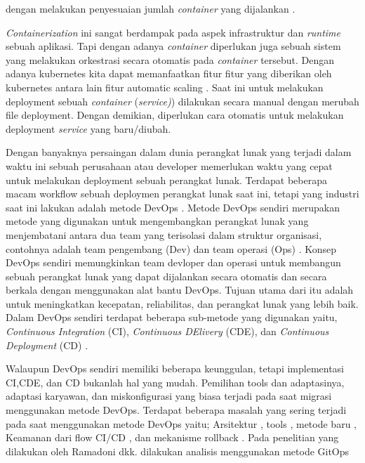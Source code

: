 dengan melakukan penyesuaian jumlah \textit{container} yang  dijalankan \cite{Singh2017}.
\par
\textit{Containerization} \cite{davidbritch} ini sangat berdampak pada aspek infrastruktur dan \textit{runtime} sebuah aplikasi.
Tapi dengan adanya \textit{container} diperlukan juga sebuah  sistem yang melakukan orkestrasi secara otomatis pada \textit{container} tersebut.
Dengan  adanya kubernetes kita dapat memanfaatkan fitur fitur yang diberikan oleh kubernetes antara lain fitur automatic scaling \cite{Leila2018,kubernetes2021What}.
Saat ini untuk melakukan  deployment sebuah \textit{container} (\textit{service)}) dilakukan secara manual dengan merubah file deployment.
Dengan demikian, diperlukan cara otomatis untuk melakukan deployment \textit{service} yang baru/diubah.
\par
Dengan banyaknya persaingan dalam dunia perangkat lunak yang terjadi dalam waktu ini sebuah perusahaan
atau developer memerlukan waktu yang cepat untuk melakukan deployment sebuah perangkat lunak. Terdapat beberapa macam
workflow sebuah deploymen perangkat lunak saat ini, tetapi yang industri saat ini lakukan adalah metode DevOps \cite{Bass2018}.
Metode DevOps sendiri merupakan metode yang digunakan untuk mengembangkan perangkat lunak yang
menjembatani antara dua team yang terisolasi dalam struktur organisasi, contohnya adalah team pengembang (Dev)
dan team operasi (Ops) \cite{Bolscher2019}. Konsep DevOps \cite{Bass2018} sendiri memungkinkan team devloper dan operasi
untuk membangun sebuah perangkat lunak yang dapat dijalankan secara otomatis dan secara berkala dengan menggunakan alat bantu DevOps.
Tujuan utama dari itu adalah untuk meningkatkan kecepatan, reliabilitas, dan perangkat lunak yang lebih baik.
Dalam DevOps sendiri terdapat beberapa sub-metode yang digunakan yaitu, \textit{Continuous Integration} (CI), \textit{Continuous DElivery} (CDE),
dan \textit{Continuous Deployment} (CD)  \cite{phoenix2013}.
\par
Walaupun DevOps sendiri memiliki beberapa keunggulan, tetapi implementasi CI,CDE, dan CD bukanlah hal yang mudah.
Pemilihan tools dan adaptasinya, adaptasi karyawan, dan miskonfigurasi yang biasa terjadi pada saat migrasi menggunakan metode DevOps.
\newpage
Terdapat beberapa masalah yang sering terjadi pada saat menggunakan metode DevOps yaitu; Arsitektur \cite{Bolscher2019},
tools \cite{Proulx2018}, metode baru  \cite{Abbass2019, Leite2019}, Keamanan dari flow CI/CD \cite{Shahin2017}, dan mekanisme rollback \cite{Fritzsch2019}.
Pada penelitian yang dilakukan oleh Ramadoni dkk. \cite{Ramadoni2021} dilakukan analisis menggunakan metode GitOps
